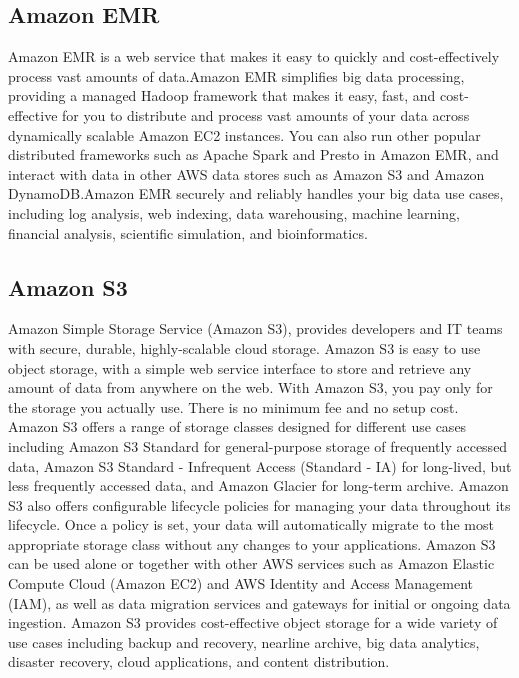 \subsection{Amazon EMR}
Amazon EMR is a web service that makes it easy to quickly and cost-effectively process vast amounts of data.Amazon EMR simplifies big data processing, providing a managed Hadoop framework that makes it easy, fast, and cost-effective for you to distribute and process vast amounts of your data across dynamically scalable Amazon EC2 instances. You can also run other popular distributed frameworks such as Apache Spark and Presto in Amazon EMR, and interact with data in other AWS data stores such as Amazon S3 and Amazon DynamoDB.Amazon EMR securely and reliably handles your big data use cases, including log analysis, web indexing, data warehousing, machine learning, financial analysis, scientific simulation, and bioinformatics.

\subsection{Amazon S3}
Amazon Simple Storage Service (Amazon S3), provides developers and IT teams with secure, durable, highly-scalable cloud storage. Amazon S3 is easy to use object storage, with a simple web service interface to store and retrieve any amount of data from anywhere on the web. With Amazon S3, you pay only for the storage you actually use. There is no minimum fee and no setup cost.
Amazon S3 offers a range of storage classes designed for different use cases including Amazon S3 Standard for general-purpose storage of frequently accessed data, Amazon S3 Standard - Infrequent Access (Standard - IA) for long-lived, but less frequently accessed data, and Amazon Glacier for long-term archive. Amazon S3 also offers configurable lifecycle policies for managing your data throughout its lifecycle. Once a policy is set, your data will automatically migrate to the most appropriate storage class without any changes to your applications.
Amazon S3 can be used alone or together with other AWS services such as Amazon Elastic Compute Cloud (Amazon EC2) and AWS Identity and Access Management (IAM), as well as data migration services and gateways for initial or ongoing data ingestion. Amazon S3 provides cost-effective object storage for a wide variety of use cases including backup and recovery, nearline archive, big data analytics, disaster recovery, cloud applications, and content distribution.










  
